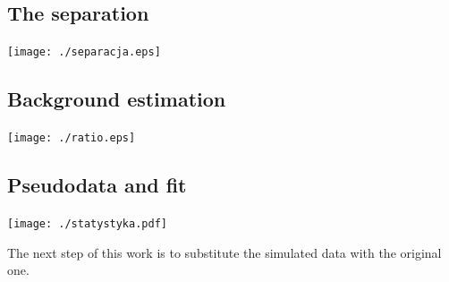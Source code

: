 \documentclass[a1,portrait]{a0poster}
\begin{document}
\begin{multicols}{2}
\subsection*{The separation}

\begin{center}
  \texttt{[image: ./separacja.eps]}
\end{center}

\subsection*{Background estimation}

\begin{center}
  \texttt{[image: ./ratio.eps]}%
\end{center}

\subsection*{Pseudodata and fit}

\begin{center}
  \texttt{[image: ./statystyka.pdf]}
\end{center}

The next step of this work is to substitute the simulated data with the original one.


\nocite{doktorat}

 


\end{multicols}
\end{document}

